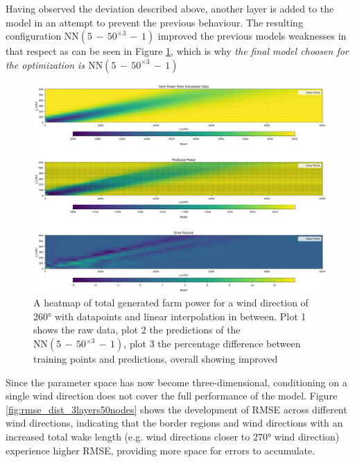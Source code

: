 Having observed the deviation described above, another layer is added to the model in an attempt to prevent the previous behaviour. The resulting configuration $\text{NN}(5\,{-}\,50^{\times3}\,{-}\,1)$ improved the previous models weaknesses in that respect as can be seen in Figure \ref{fig:prob_model_colormap_2}, which is why \textit{the final model choosen for the optimization is  $\text{NN}(5\,{-}\,50^{\times3}\,{-}\,1)$}

\begin{figure}[h] 
	\centering
	\includegraphics[width=1\textwidth]{figures/optimization/prob_model_colormap_2.png} 
	\caption{A heatmap of total generated farm power for a wind direction of 260° with datapoints and linear interpolation in between. Plot 1 shows the raw data, plot 2 the predictions of the $\text{NN}(5\,{-}\,50^{\times3}\,{-}\,1)$, plot 3 the percentage difference between training points and predictions, overall showing improved }
	\label{fig:prob_model_colormap_2}
\end{figure}

Since the parameter space has now become three-dimensional, conditioning on a single wind direction does not cover the full performance of the model. Figure \ref{fig:rmse_dist_3layers50nodes} shows the development of RMSE across different wind directions, indicating that the border regions and wind directions with an increased total wake length (e.g. wind directions closer to 270° wind direction) experience higher RMSE, providing more space for errors to accumulate. 

